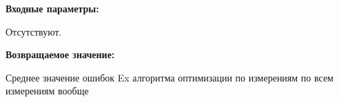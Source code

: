 \textbf{Входные параметры:}

Отсутствуют.

\textbf{Возвращаемое значение:}

Среднее значение ошибок Ex алгоритма оптимизации по измерениям по всем измерениям вообще